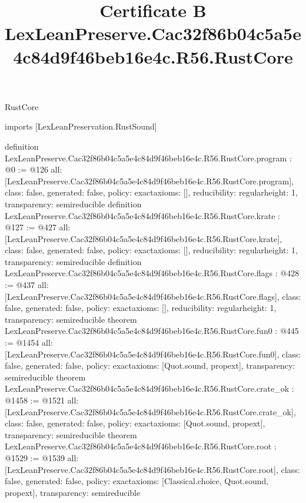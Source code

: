 \begin{lexlean}{RustCore}
\title{Certificate B LexLeanPreserve.Cac32f86b04c5a5e4c84d9f46beb16e4c.R56.RustCore}
\begin{coremodule}
imports [LexLeanPreservation.RustSound]

definition LexLeanPreserve.Cac32f86b04c5a5e4c84d9f46beb16e4c.R56.RustCore.program : @0 := @126 {
  all: [LexLeanPreserve.Cac32f86b04c5a5e4c84d9f46beb16e4c.R56.RustCore.program],
  class: false,
  generated: false,
  policy: exact{axioms: []},
  reducibility: regular{height: 1},
  transparency: semireducible
}
definition LexLeanPreserve.Cac32f86b04c5a5e4c84d9f46beb16e4c.R56.RustCore.krate : @127 := @427 {
  all: [LexLeanPreserve.Cac32f86b04c5a5e4c84d9f46beb16e4c.R56.RustCore.krate],
  class: false,
  generated: false,
  policy: exact{axioms: []},
  reducibility: regular{height: 1},
  transparency: semireducible
}
definition LexLeanPreserve.Cac32f86b04c5a5e4c84d9f46beb16e4c.R56.RustCore.flags : @428 := @437 {
  all: [LexLeanPreserve.Cac32f86b04c5a5e4c84d9f46beb16e4c.R56.RustCore.flags],
  class: false,
  generated: false,
  policy: exact{axioms: []},
  reducibility: regular{height: 1},
  transparency: semireducible
}
theorem LexLeanPreserve.Cac32f86b04c5a5e4c84d9f46beb16e4c.R56.RustCore.fun0 : @445 := @1454 {
  all: [LexLeanPreserve.Cac32f86b04c5a5e4c84d9f46beb16e4c.R56.RustCore.fun0],
  class: false,
  generated: false,
  policy: exact{axioms: [Quot.sound, propext]},
  transparency: semireducible
}
theorem LexLeanPreserve.Cac32f86b04c5a5e4c84d9f46beb16e4c.R56.RustCore.crate_ok : @1458 := @1521 {
  all: [LexLeanPreserve.Cac32f86b04c5a5e4c84d9f46beb16e4c.R56.RustCore.crate_ok],
  class: false,
  generated: false,
  policy: exact{axioms: [Quot.sound, propext]},
  transparency: semireducible
}
theorem LexLeanPreserve.Cac32f86b04c5a5e4c84d9f46beb16e4c.R56.RustCore.root : @1529 := @1539 {
  all: [LexLeanPreserve.Cac32f86b04c5a5e4c84d9f46beb16e4c.R56.RustCore.root],
  class: false,
  generated: false,
  policy: exact{axioms: [Classical.choice, Quot.sound, propext]},
  transparency: semireducible
}


\end{coremodule}
\end{lexlean}
